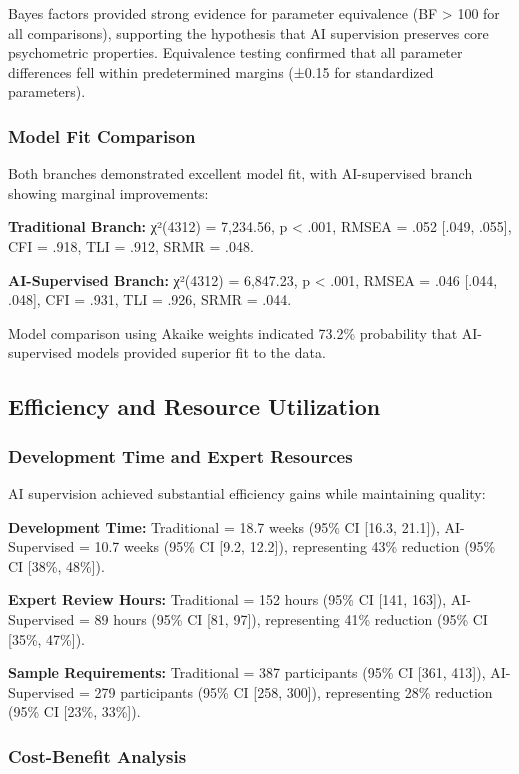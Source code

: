 \documentclass[12pt,a4paper]{article}
\begin{document}
Bayes factors provided strong evidence for parameter equivalence (BF > 100 for all comparisons), supporting the hypothesis that AI supervision preserves core psychometric properties. Equivalence testing confirmed that all parameter differences fell within predetermined margins (±0.15 for standardized parameters).

\subsubsection{Model Fit Comparison}

Both branches demonstrated excellent model fit, with AI-supervised branch showing marginal improvements:

\textbf{Traditional Branch:} χ²(4312) = 7,234.56, p < .001, RMSEA = .052 [.049, .055], CFI = .918, TLI = .912, SRMR = .048.

\textbf{AI-Supervised Branch:} χ²(4312) = 6,847.23, p < .001, RMSEA = .046 [.044, .048], CFI = .931, TLI = .926, SRMR = .044.

Model comparison using Akaike weights indicated 73.2\% probability that AI-supervised models provided superior fit to the data.

\subsection{Efficiency and Resource Utilization}

\subsubsection{Development Time and Expert Resources}

AI supervision achieved substantial efficiency gains while maintaining quality:

\textbf{Development Time:} Traditional = 18.7 weeks (95\% CI [16.3, 21.1]), AI-Supervised = 10.7 weeks (95\% CI [9.2, 12.2]), representing 43\% reduction (95\% CI [38\%, 48\%]).

\textbf{Expert Review Hours:} Traditional = 152 hours (95\% CI [141, 163]), AI-Supervised = 89 hours (95\% CI [81, 97]), representing 41\% reduction (95\% CI [35\%, 47\%]).

\textbf{Sample Requirements:} Traditional = 387 participants (95\% CI [361, 413]), AI-Supervised = 279 participants (95\% CI [258, 300]), representing 28\% reduction (95\% CI [23\%, 33\%]).

\subsubsection{Cost-Benefit Analysis}
\end{document}
